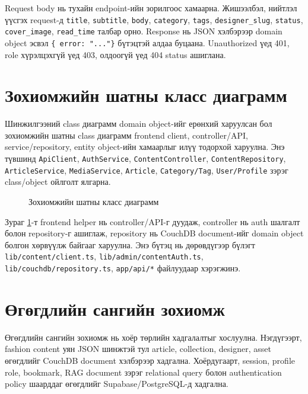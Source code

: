 Request body нь тухайн endpoint-ийн зорилгоос хамаарна. Жишээлбэл, нийтлэл үүсгэх request-д \texttt{title}, \texttt{subtitle}, \texttt{body}, \texttt{category}, \texttt{tags}, \texttt{designer\_slug}, \texttt{status}, \texttt{cover\_image}, \texttt{read\_time} талбар орно. Response нь JSON хэлбэрээр domain object эсвэл \texttt{\{ error: "..."\}} бүтэцтэй алдаа буцаана. Unauthorized үед 401, role хүрэлцэхгүй үед 403, олдоогүй үед 404 status ашиглана.

\section{Зохиомжийн шатны класс диаграмм}
Шинжилгээний class диаграмм domain object-ийг ерөнхий харуулсан бол зохиомжийн шатны class диаграмм frontend client, controller/API, service/repository, entity object-ийн хамаарлыг илүү тодорхой харуулна. Энэ түвшинд \texttt{ApiClient}, \texttt{AuthService}, \texttt{ContentController}, \texttt{ContentRepository}, \texttt{ArticleService}, \texttt{MediaService}, \texttt{Article}, \texttt{Category/Tag}, \texttt{User/Profile} зэрэг class/object ойлголт ялгарна.

\begin{figure}[htbp]
  \centering
  \resizebox{\textwidth}{!}{}
  \caption[Зохиомжийн шатны класс диаграмм]{Зохиомжийн шатны класс диаграмм}
  \label{fig:ch3-design-class}
\end{figure}

Зураг \ref{fig:ch3-design-class}-т frontend helper нь controller/API-г дуудаж, controller нь auth шалгалт болон repository-г ашиглаж, repository нь CouchDB document-ийг domain object болгон хөрвүүлж байгааг харуулна. Энэ бүтэц нь дөрөвдүгээр бүлэгт \texttt{lib/content/client.ts}, \texttt{lib/admin/contentAuth.ts}, \texttt{lib/couchdb/repository.ts}, \texttt{app/api/*} файлуудаар хэрэгжинэ.

\section{Өгөгдлийн сангийн зохиомж}
Өгөгдлийн сангийн зохиомж нь хоёр төрлийн хадгалалтыг хослуулна. Нэгдүгээрт, fashion content уян JSON шинжтэй тул article, collection, designer, asset өгөгдлийг CouchDB document хэлбэрээр хадгална. Хоёрдугаарт, session, profile role, bookmark, RAG document зэрэг relational query болон authentication policy шаарддаг өгөгдлийг Supabase/PostgreSQL-д хадгална.

